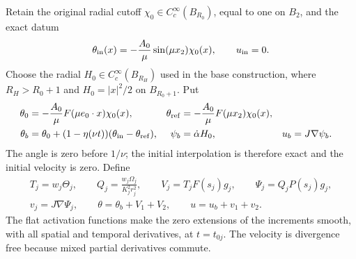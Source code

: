 Retain the original radial cutoff $\chi_0\in C_c^\infty(B_{R_0})$,
equal to one on $B_2$, and the exact datum
\[
 \theta_{\rm in}(x)=-\frac{A_0}{\mu}\sin(\mu x_2)\chi_0(x),
 \qquad u_{\rm in}=0.
\]
Choose the radial $H_0\in C_c^\infty(B_{R_H})$ used in the
base construction, where $R_H>R_0+1$ and
$H_0=|x|^2/2$ on $B_{R_0+1}$. Put
\begin{align}
 \theta_0&=-\frac{A_0}{\mu}F(\mu e_0\cdot x)\chi_0(x),
 &\theta_{\rm ref}&=-\frac{A_0}{\mu}F(\mu x_2)\chi_0(x),\nonumber\\
 \theta_b&=\theta_0+(1-\eta(\nu t))
                          (\theta_{\rm in}-\theta_{\rm ref}),
 &\psi_b&=\dot\alpha H_0,&u_b&=J\nabla\psi_b.
 \label{cvlane:ms:base}
\end{align}
The angle is zero before $1/\nu$; the initial interpolation is
therefore exact and the initial velocity is zero. Define
\begin{equation}\label{cvlane:ms:fields}
 \begin{gathered}
 T_j=w_j\Theta_j,\qquad Q_j=\frac{w_j\Omega_j}{K_j^2r_j^2},
 \qquad V_j=T_jF(s_j)g_j,\qquad\Psi_j=Q_jP(s_j)g_j,\\
 v_j=J\nabla\Psi_j,\qquad
 \theta=\theta_b+V_1+V_2,\qquad u=u_b+v_1+v_2.
 \end{gathered}
\end{equation}
The flat activation functions make the zero extensions of the
increments smooth, with all spatial and temporal derivatives, at
$t=t_{0j}$. The velocity is divergence free because mixed partial
derivatives commute.

